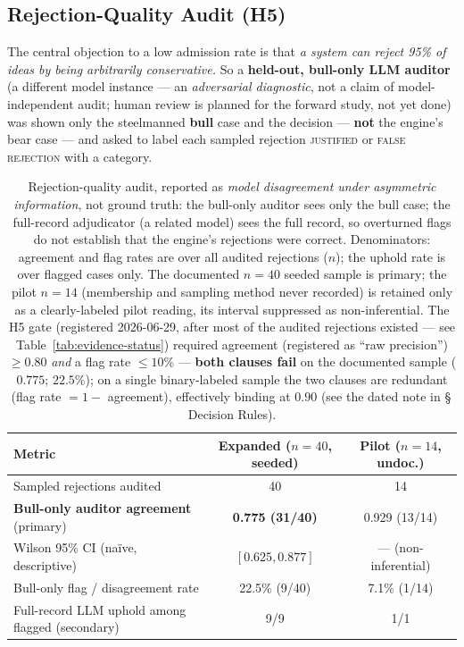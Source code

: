 \documentclass[11pt]{article}
\begin{document}
\subsection{Rejection-Quality Audit (H5)}

The central objection to a low admission rate is that \emph{a system can
reject 95\% of ideas by being arbitrarily conservative.}
So a \textbf{held-out, bull-only LLM auditor} (a different model instance --- an
\emph{adversarial diagnostic}, not a claim of model-independent audit; human review is
planned for the forward study, not yet done) was shown only the steelmanned
\textbf{bull} case and the decision --- \textbf{not} the engine's bear case
--- and asked to label each sampled rejection \textsc{justified} or
\textsc{false rejection} with a category.

\begin{table}[h]
\centering
\footnotesize
\begin{tabular}{lcc}
\toprule
\textbf{Metric} & \textbf{Expanded ($n{=}40$, seeded)} & \textbf{Pilot ($n{=}14$, undoc.)} \\
\midrule
Sampled rejections audited                        & 40                     & 14 \\
\textbf{Bull-only auditor agreement} (primary)    & \textbf{0.775 (31/40)} & 0.929 (13/14) \\
Wilson 95\% CI (na\"ive, descriptive)             & $[0.625, 0.877]$       & --- (non-inferential) \\
Bull-only flag / disagreement rate                & 22.5\% (9/40)          & 7.1\% (1/14) \\
Full-record LLM uphold among flagged (secondary)  & 9/9                    & 1/1 \\
\bottomrule
\end{tabular}
\caption{Rejection-quality audit, reported as \emph{model disagreement under asymmetric
information}, not ground truth: the bull-only auditor sees only the bull case; the full-record
adjudicator (a related model) sees the full record, so overturned flags do not establish that the
engine's rejections were correct. Denominators: agreement and flag rates are over all audited
rejections ($n$); the uphold rate is over flagged cases only. The documented $n{=}40$ seeded sample
is primary; the pilot $n{=}14$ (membership and sampling method never recorded) is retained only as a
clearly-labeled pilot reading, its interval suppressed as non-inferential. The H5 gate (registered
2026-06-29, after most of the audited rejections existed --- see Table~\ref{tab:evidence-status})
required agreement (registered as ``raw precision'') $\geq 0.80$ \emph{and} a flag rate $\leq 10\%$
--- \textbf{both clauses fail} on the documented sample ($0.775$; $22.5\%$); on a single
binary-labeled sample the two clauses are redundant (flag rate $= 1 -$ agreement), effectively
binding at $0.90$ (see the dated note in \S\,Decision Rules).}
\end{table}
\end{document}
